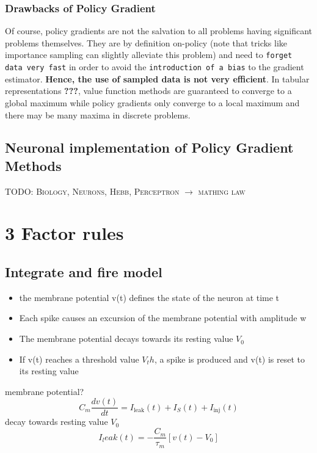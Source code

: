 \documentclass[11pt]{article}
\begin{document}
\subsubsection{Drawbacks of Policy Gradient}
Of course, policy gradients are not the salvation to all problems having significant problems themselves. They are by definition on-policy (note that tricks like importance sampling can slightly alleviate this problem) and need to \texttt{forget data very fast} in order to avoid the \texttt{introduction of a bias} to the gradient estimator. \textbf{Hence, the use of sampled data is not very efficient}. In tabular representations \textbf{???}, value function methods are guaranteed to converge to a global maximum while policy gradients only converge to a local maximum and there may be many maxima in discrete problems. %

\subsection{Neuronal implementation of Policy Gradient Methods}
\textsc{TODO: Biology, Neurons, Hebb, Perceptron $\rightarrow$ mathing law}


\section{3 Factor rules}
\subsection{Integrate and fire model}
\begin{itemize}
\item the membrane potential v(t) defines the state of the neuron at time t
\item Each spike causes an excursion of the membrane potential with amplitude w
\item The membrane potential decays towards its resting value $V_0$
\item If v(t) reaches a threshold value $V_th$, a spike is produced and v(t) is reset to its resting value
\end{itemize}
membrane potential?
\[
C_m \frac{dv(t)}{dt}=I_{\text{leak}}(t)+I_S(t)+I_{\text{inj}}(t)
\]
decay towards resting value $V_0$
\[
I_leak(t)=-\frac{C_m}{\tau_m}\left[v(t)-V_0\right]
\]
\end{document}
